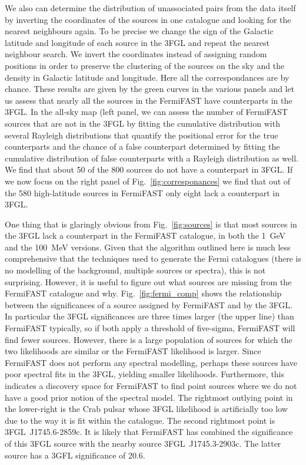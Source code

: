 \documentclass[useAMS,usenatbib]{mn2e}
\begin{document}
We also can determine the distribution of unassociated pairs from the
data itself by inverting the coordinates of the sources in one
catalogue and looking for the nearest neighbours again.  To be precise
we change the sign of the Galactic latitude and longitude of each
source in the 3FGL and repeat the nearest neighbour search.  We invert
the coordinates instead of assigning random positions in order to
preserve the clustering of the sources on the sky and the density in
Galactic latitude and longitude.  Here all the correspondances are
by chance.  These results are given by the green curves in the
various panels and let us assess that nearly all the sources in the
FermiFAST have counterparts in the 3FGL.  In the all-sky map (left
panel, we can assess the number of FermiFAST sources
that are not in the 3FGL by fitting the cumulative distribution with
several Rayleigh distributions that quantify the positional error for
the true counterparts and the chance of a false counterpart determined
by fitting the cumulative distribution of false counterparts with a
Rayleigh distribution as well.  We find that about 50 of the 800
sources do not have a counterpart in 3FGL.  If we now focus on the
right panel of Fig.~\ref{fig:corresponances} we find that out of the
580 high-latitude sources in FermiFAST only eight lack a
counterpart in 3FGL.

One thing that is glaringly obvious from Fig.~\ref{fig:sources} is
that most sources in the 3FGL lack a counterpart in the FermiFAST
catalogue, in both the 1~GeV and the 100~MeV versions.  Given that the
algorithm outlined here is much less comprehensive that the techniques
used to generate the Fermi catalogues (there is no modelling of the
background, multiple sources or spectra), this is not surprising.
However, it is useful to figure out what sources are missing from the
FermiFAST catalogue and why.  Fig.~\ref{fig:fermi_comp} shows the
relationship between the significances of a source assigned by
FermiFAST and by the 3FGL.  In particular the 3FGL significances are
three times larger (the upper line) than FermiFAST typically, so if
both apply a threshold of five-sigma, FermiFAST will find fewer
sources.  However, there is a large population of sources for which
the two likelihoods are similar or the FermiFAST likelihood is larger.
Since FermiFAST does not perform any spectral modelling, perhaps these
sources have poor spectral fits in the 3FGL, yielding smaller
likelihoods.  Furthermore, this indicates a discovery space for
FermiFAST to find point sources where we do not have a good prior
notion of the spectral model.  The rightmost outlying point in the
lower-right is the Crab pulsar whose 3FGL likelihood is artificially
too low due to the way it is fit within the catalogue.  The second
rightmost point is 3FGL~J1745.6-2859c. It is likely that FermiFAST has
combined the significance of this 3FGL source with the nearby source
3FGL~J1745.3-2903c.  The latter source has a 3GFL significance of 20.6.
\end{document}
